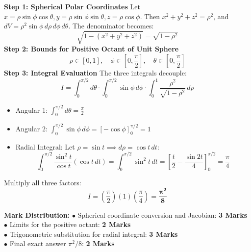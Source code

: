 \begin{solutionbox}
\textbf{Step 1: Spherical Polar Coordinates}
Let $x = \rho\sin\phi\cos\theta, y = \rho\sin\phi\sin\theta, z = \rho\cos\phi$.
Then $x^2 + y^2 + z^2 = \rho^2$, and $dV = \rho^2 \sin\phi \, d\rho \, d\phi \, d\theta$.
The denominator becomes:
\[
\sqrt{1 - (x^2 + y^2 + z^2)} = \sqrt{1 - \rho^2}
\]
\textbf{Step 2: Bounds for Positive Octant of Unit Sphere}
\[
\rho \in [0, 1], \quad \phi \in \left[0, \frac{\pi}{2}\right], \quad \theta \in \left[0, \frac{\pi}{2}\right]
\]
\textbf{Step 3: Integral Evaluation}
The three integrals decouple:
\[
I = \int_0^{\pi/2} d\theta \cdot \int_0^{\pi/2} \sin\phi \, d\phi \cdot \int_0^1 \frac{\rho^2}{\sqrt{1 - \rho^2}} \, d\rho
\]
\begin{itemize}[leftmargin=6mm]
    \item Angular 1: $\int_0^{\pi/2} d\theta = \frac{\pi}{2}$
    \item Angular 2: $\int_0^{\pi/2} \sin\phi \, d\phi = [-\cos\phi]_0^{\pi/2} = 1$
    \item Radial Integral: Let $\rho = \sin t \implies d\rho = \cos t \, dt$:
    \[
    \int_0^{\pi/2} \frac{\sin^2 t}{\cos t} (\cos t \, dt) = \int_0^{\pi/2} \sin^2 t \, dt = \left[ \frac{t}{2} - \frac{\sin 2t}{4} \right]_0^{\pi/2} = \frac{\pi}{4}
    \]
\end{itemize}
Multiply all three factors:
\[
I = \left(\frac{\pi}{2}\right)(1)\left(\frac{\pi}{4}\right) = \mathbf{\frac{\pi^2}{8}}
\]

\begin{markingrubric}
\textbf{Mark Distribution:}
$\bullet$ Spherical coordinate conversion and Jacobian: \textbf{3 Marks}\\
$\bullet$ Limits for the positive octant: \textbf{2 Marks}\\
$\bullet$ Trigonometric substitution for radial integral: \textbf{3 Marks}\\
$\bullet$ Final exact answer $\pi^2 / 8$: \textbf{2 Marks}
\end{markingrubric}
\end{solutionbox}


